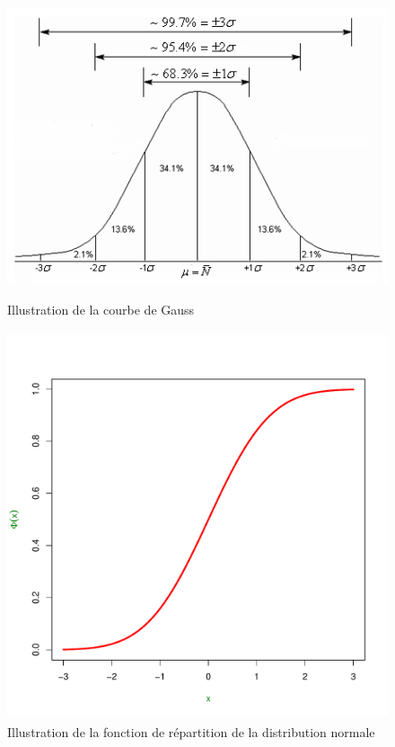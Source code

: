 \documentclass[a4paper,titlepage] {scrartcl}
\begin{document}
\begin{figure}[!htbp]
	\centering
		\includegraphics[height=3.5in]{img.png}
	\caption{Illustration de la courbe de Gauss}
	\label{fig:img}
\end{figure}

\begin{figure}[htbp]
	\centering
		\includegraphics[height=4.5in]{cumnorm.pdf}
	\caption{Illustration de la fonction de répartition de la distribution normale}
	\label{fig:cumnorm}
\end{figure}
\end{document}
